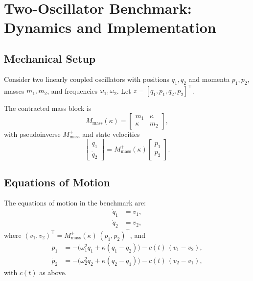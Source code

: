 \documentclass[11pt]{article}
\begin{document}
\section{Two-Oscillator Benchmark: Dynamics and Implementation}

\subsection{Mechanical Setup}

Consider two linearly coupled oscillators with positions $q_1, q_2$ and momenta $p_1, p_2$, masses $m_1, m_2$, and frequencies $\omega_1, \omega_2$. Let $z = [q_1, p_1, q_2, p_2]^\top$.

The contracted mass block is
\begin{equation}
  M_{\text{mass}}(\kappa) =
  \begin{bmatrix}
    m_1 & \kappa\\
    \kappa & m_2
  \end{bmatrix},
\end{equation}
with pseudoinverse $M_{\text{mass}}^{+}$ and state velocities
\begin{equation}
  \begin{bmatrix}
    \dot q_1\\ \dot q_2
  \end{bmatrix}
  = M_{\text{mass}}^{+}(\kappa)
    \begin{bmatrix}
      p_1\\ p_2
    \end{bmatrix}.
\end{equation}

\subsection{Equations of Motion}

The equations of motion in the benchmark are:
\begin{align}
  \dot q_1 &= v_1,\\
  \dot q_2 &= v_2,
\end{align}
where $(v_1,v_2)^\top = M_{\text{mass}}^{+}(\kappa)\,(p_1,p_2)^\top$, and
\begin{align}
  \dot p_1 &= -\big(\omega_1^2 q_1 + \kappa (q_1 - q_2)\big)
             - c(t)\,(v_1 - v_2),\\
  \dot p_2 &= -\big(\omega_2^2 q_2 + \kappa (q_2 - q_1)\big)
             - c(t)\,(v_2 - v_1),
\end{align}
with $c(t)$ as above.
\end{document}
